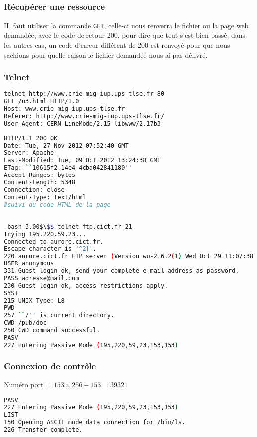 \documentclass[a4paper, 11pt]{article}
\newcommand{\http}{\bsc{http}}
\newcommand{\ftp}{\bsc{ftp}}
\begin{document}
	\subsection{\http}
	\subsubsection{Récupérer une ressource}
	IL faut utiliser la commande \http{}  \texttt{GET}, celle-ci nous renverra le fichier ou la page web demandée, avec le code de retour 200, pour dire que tout
	s'est bien passé, dans les autres cas, un code d'erreur différent de 200 est renvoyé pour que nous sachions pour quelle raison le fichier demandée nous ai
	pas délivré.
	\subsubsection{Telnet \http}
\begin{lstlisting}[language=bash, basicstyle=\scriptsize\ttfamily]
telnet http://www.crie-mig-iup.ups-tlse.fr 80
GET /u3.html HTTP/1.0
Host: www.crie-mig-iup.ups-tlse.fr
Referer: http://www.crie-mig-iup.ups-tlse.fr/
User-Agent: CERN-LineMode/2.15 libwww/2.17b3
\end{lstlisting}	
\begin{lstlisting}[caption=Réponse du serveur, language=bash, basicstyle=\scriptsize\ttfamily]
HTTP/1.1 200 OK
Date: Tue, 27 Nov 2012 07:52:40 GMT
Server: Apache
Last-Modified: Tue, 09 Oct 2012 13:24:38 GMT
ETag: ``10615f2-14e4-4cba042841180''
Accept-Ranges: bytes
Content-Length: 5348
Connection: close
Content-Type: text/html
#suivi du code HTML de la page
\end{lstlisting}
	\subsection{\ftp}
\begin{lstlisting}[language=bash, basicstyle=\scriptsize\ttfamily]
-bash-3.00$\$$ telnet ftp.cict.fr 21
Trying 195.220.59.23...
Connected to aurore.cict.fr.
Escape character is '^2]'.
220 aurore.cict.fr FTP server (Version wu-2.6.2(1) Wed Oct 29 11:07:38 MET 2003) ready.
USER anonymous
331 Guest login ok, send your complete e-mail address as password.
PASS adresse@mail.com
230 Guest login ok, access restrictions apply.
SYST
215 UNIX Type: L8
PWD
257 ``/'' is current directory.
CWD /pub/doc
250 CWD command successful.
PASV
227 Entering Passive Mode (195,220,59,23,153,153)
\end{lstlisting}
	\subsubsection{Connexion de contrôle}
	Numéro port = $153\times 256 + 153 = 39321$
\begin{lstlisting}[caption=connexion de contrôle, language=bash, basicstyle=\scriptsize\ttfamily]
PASV
227 Entering Passive Mode (195,220,59,23,153,153)
LIST
150 Opening ASCII mode data connection for /bin/ls.
226 Transfer complete.
\end{lstlisting}
\end{document}
